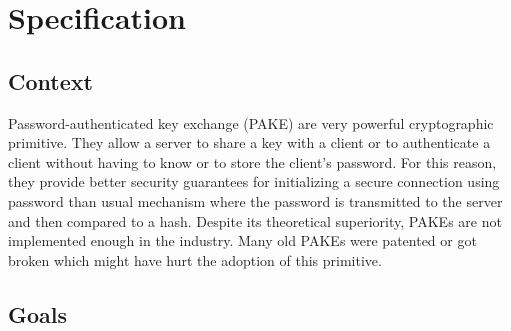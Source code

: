﻿\documentclass[../report.tex]{subfiles}
\begin{document}
\chapter{Specification}
\section*{Context}


Password-authenticated key exchange (PAKE) are very powerful cryptographic primitive. They allow a server to share a key with a client or to authenticate a client without having to know or to store the client's password.
For this reason, they provide better security guarantees for initializing a secure connection using password than usual mechanism where the password is transmitted to the server and then compared to a hash.
Despite its theoretical superiority, PAKEs are not implemented enough in the industry. Many old PAKEs were patented or got broken which might have hurt the adoption of this primitive.
\section*{Goals}

% 
% 
% 
% 
\end{document}
